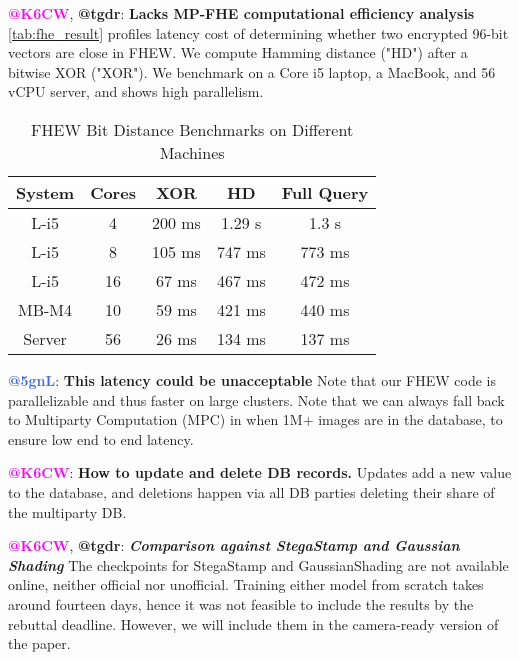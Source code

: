 \documentclass[10pt,twocolumn,letterpaper]{article}
\makeatletter
\newcommand{\rksixcw}{\textcolor{Magenta}{\bf \textbf{@K6CW}}}
\newcommand{\rtgdr}{\textcolor{RawSienna}{\bf \textbf{@tgdr}}}
\newcommand{\rfivegnl}{\textcolor{RoyalBlue}{\bf \textbf{@5gnL}}}
\makeatother
\begin{document}
\noindent \rksixcw, \rtgdr: \textbf{Lacks MP-FHE computational efficiency analysis} \autoref{tab:fhe_result} profiles latency cost of determining whether two encrypted 96-bit vectors are close in FHEW. We compute Hamming distance ("HD") after a bitwise XOR ("XOR"). We benchmark on a Core i5 laptop, a MacBook, and 56 vCPU server, and shows high parallelism.
\vspace{-8pt}

\begin{table}[h]
\centering
\scriptsize
\setlength{\tabcolsep}{11pt}
\begin{tabular}{ccccc}
\hline
System & Cores & XOR & HD & Full Query \\ \hline
L-i5 & 4 & 200 ms & 1.29 s & 1.3 s \\
L-i5 & 8 & 105 ms & 747 ms & 773 ms \\
L-i5 & 16 & 67 ms & 467 ms & 472 ms \\
MB-M4 & 10 & 59 ms & 421 ms &  440 ms \\
Server & 56 & 26 ms & 134 ms & 137 ms \\ \hline
\end{tabular}
\vspace{-5pt}
\caption{FHEW Bit Distance Benchmarks on Different Machines}
\label{tab:fhe_result}
\end{table}
\vspace{-10pt}

\noindent \rfivegnl: \textbf{This latency could be unacceptable} Note that our FHEW code is parallelizable and thus faster on large clusters. Note that we can always fall back to Multiparty Computation (MPC) in when 1M+ images are in the database, to ensure low end to end latency.

\noindent \rksixcw: \textbf{How to update and delete DB records.} Updates add a new value to the database, and deletions happen via all DB parties deleting their share of the multiparty DB.

\noindent \rksixcw, \rtgdr:
\textbf{\emph{Comparison against StegaStamp and Gaussian Shading}} The checkpoints for StegaStamp and GaussianShading are not available online, neither official nor unofficial. Training either model from scratch takes around fourteen days, hence it was not feasible to include the results by the rebuttal deadline. However, we will include them in the camera-ready version of the paper.
\end{document}
